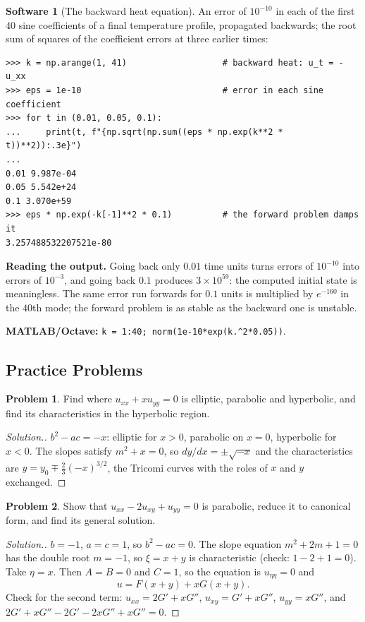 \documentclass[11pt,a4paper]{article}
\numberwithin{equation}{section}
\theoremstyle{definition}
\newtheorem{software}[thm]{Software}
\newtheorem{problemx}{Problem}[subsection]
\newenvironment{problem}{\begin{problemx}}{\end{problemx}}
\newenvironment{solution}
  {\renewcommand{\qedsymbol}{}\begin{proof}[\textit{Solution}.]}
  {\end{proof}}
\begin{document}
\begin{software}[The backward heat equation]
\label{sw:backheat}
An error of $10^{-10}$ in each of the first $40$ sine coefficients of a final temperature profile, propagated backwards; the root sum of squares of the coefficient errors at three earlier times:
{\small\begin{verbatim}
>>> k = np.arange(1, 41)                   # backward heat: u_t = -u_xx
>>> eps = 1e-10                            # error in each sine coefficient
>>> for t in (0.01, 0.05, 0.1):
...     print(t, f"{np.sqrt(np.sum((eps * np.exp(k**2 * t))**2)):.3e}")
...
0.01 9.987e-04
0.05 5.542e+24
0.1 3.070e+59
>>> eps * np.exp(-k[-1]**2 * 0.1)          # the forward problem damps it
3.257488532207521e-80
\end{verbatim}}
\textbf{Reading the output.} Going back only $0.01$ time units turns errors of $10^{-10}$ into errors of $10^{-3}$, and going back $0.1$ produces $3 \times 10^{59}$: the computed initial state is meaningless. The same error run forwards for $0.1$ units is multiplied by $e^{-160}$ in the $40$th mode; the
forward problem is as stable as the backward one is unstable.

\textbf{MATLAB/Octave:} \texttt{k = 1:40; norm(1e-10*exp(k.\^{}2*0.05))}.
\end{software}

\subsection{Practice Problems}

\begin{problem}
Find where $u_{xx} + xu_{yy} = 0$ is elliptic, parabolic and hyperbolic, and find its characteristics in the hyperbolic region.
\end{problem}

\begin{solution}
$b^2 - ac = -x$: elliptic for $x > 0$, parabolic on $x = 0$, hyperbolic for $x < 0$. The slopes satisfy $m^2 + x = 0$, so $dy/dx = \pm\sqrt{-x}$ and the characteristics are $y = y_0 \mp \frac23(-x)^{3/2}$, the Tricomi curves with the roles of $x$ and $y$ exchanged.
\end{solution}

\begin{problem}
Show that $u_{xx} - 2u_{xy} + u_{yy} = 0$ is parabolic, reduce it to canonical form, and find its general solution.
\end{problem}

\begin{solution}
$b = -1$, $a = c = 1$, so $b^2 - ac = 0$. The slope equation $m^2 + 2m + 1 = 0$ has the double root $m = -1$, so $\xi = x + y$ is characteristic (check: $1 - 2 + 1 = 0$). Take $\eta = x$. Then $A = B = 0$ and $C = 1$, so the equation is $u_{\eta\eta} = 0$ and
\[
u = F(x + y) + xG(x + y) .
\]
Check for the second term: $u_{xx} = 2G' + xG''$, $u_{xy} = G' + xG''$, $u_{yy} = xG''$, and $2G' + xG'' - 2G' - 2xG'' + xG'' = 0$.
\end{solution}
\end{document}

